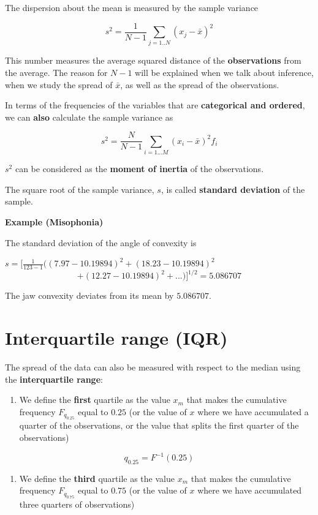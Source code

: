 \documentclass[
]{book}
\providecommand{\tightlist}{%
  \setlength{\itemsep}{0pt}\setlength{\parskip}{0pt}}
\begin{document}
The dispersion about the mean is measured by the sample variance

\[s^2=\frac{ 1}{ N-1} \sum_{j=1..N} ( x_j -\bar{x})^2\]

This number measures the average squared distance of the \textbf{observations} from the average. The reason for \(N-1\) will be explained when we talk about inference, when we study the spread of \(\bar{x}\), as well as the spread of the observations.

In terms of the frequencies of the variables that are \textbf{categorical and ordered}, we can \textbf{also} calculate the sample variance as

\[s^2=\frac{N}{N-1} \sum_{i=1... M} (x_i -\bar{x})^2 f_i\]

\(s^2\) can be considered as the \textbf{moment of inertia} of the observations.

The square root of the sample variance, \(s\), is called \textbf{standard deviation} of the sample.

\textbf{Example (Misophonia)}

The standard deviation of the angle of convexity is

\(s= [\frac{ 1}{123-1}((7.97-10.19894)^2+ (18.23-10.19894)^2\)
\[+ (12.27-10.19894 )^ 2 + ...)]^{1/2} = 5.086707\]

The jaw convexity deviates from its mean by \(5.086707\).

\hypertarget{interquartile-range-iqr}{%
\section{Interquartile range (IQR)}\label{interquartile-range-iqr}}

The spread of the data can also be measured with respect to the median using the \textbf{interquartile range}:

\begin{enumerate}
\def\labelenumi{\arabic{enumi})}
\tightlist
\item
  We define the \textbf{first} quartile as the value \(x_m\) that makes the cumulative frequency \(F_{q_{0.25}}\) equal to \(0.25\) (or the value of \(x\) where we have accumulated a quarter of the observations, or the value that splits the first quarter of the observations)
\end{enumerate}

\[q_{0.25}=F^{-1}(0.25)\]

\begin{enumerate}
\def\labelenumi{\arabic{enumi})}
\setcounter{enumi}{1}
\tightlist
\item
  We define the \textbf{third} quartile as the value \(x_m\) that makes the cumulative frequency \(F_{q_{0.75}}\) equal to \(0.75\) (or the value of \(x\) where we have accumulated three quarters of observations)
\end{enumerate}
\end{document}
